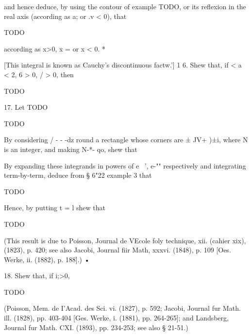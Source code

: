 and hence deduce, by using the contour of  example TODO, or its
reflexion in the real axis (according as a; or .v < 0), that

TODO

according as x>0, x = or x < 0. *

[This integral is known as Cauchy's discontinuous factw.'] 1 6. Shew
that, if < a < 2, 6 > 0, / > 0, then

TODO

%
%

17. Let TODO

TODO

By considering / - - -dz round a rectangle whose corners are ± JV+
)±i, where N is an integer, and making N-*- qo, shew that

By expanding these integrands in powers of e~ ', e-"" respectively
and integrating term-by-term, deduce from § 6"22 example 3 that

TODO

Hence, by putting t = l shew that

TODO

(This result is due to Poisson, Journal de VEcole foly technique, xii.
(cahier xix), (1823), p. 420; see also Jacobi, Journal fiir Math,
xxxvi. (1848), p. 109 [Oes. Werke, ii. (1882), p. 188].) •

18. Shew that, if i;>0,

TODO

(Poisson, Mem. de I'Acad. des Sci. vi. (1827), p. 592; Jacobi,
Journal fur Math. ill. (1828), pp. 403-404 [Ges. Werke, i. (1881), pp.
264-265]; and Landsberg, Journal fur Math. CXI. (1893), pp. 234-253;
see also § 21-51.)

